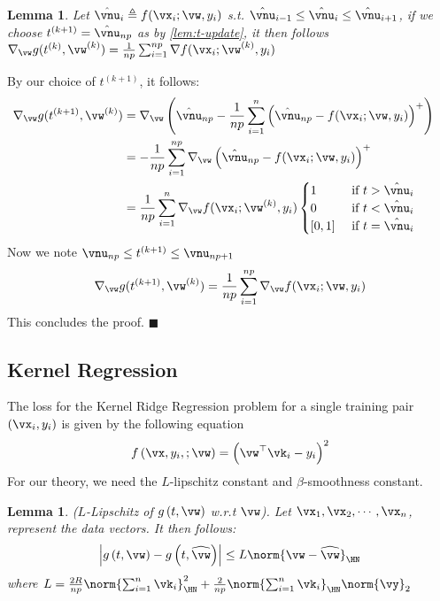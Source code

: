 \documentclass{article} %
\theoremstyle{plain}
\newtheorem{lemma}[thm]{Lemma}
\theoremstyle{definition}
\theoremstyle{remark}
\newcommand{\ccref}[1]{\textcolor{black}{\cref{#1}}}
\begin{document}
	\begin{lemma}
		Let $\hat{\vnu}_i \triangleq f(\vx_i;\vw,y_i)$ s.t. $\hat{\vnu}_{i-1} \leq \hat{\vnu}_{i} \leq \hat{\vnu}_{i+1}$, if we choose $t^{(k+1)} = \hat{\vnu}_{np}$ as by \ccref{lem:t-update}, it then follows $ \nabla_\vw g(t^{(k)},\vw^{(k)}) = \frac{1}{np}\sum_{i=1}^{np} \nabla f(\vx_i;\vw^{(k)},y_i)$
	\end{lemma}
		By our choice of $t^{(k+1)}$, it follows:
		\begin{align}
			\nabla_\vw g(t^{(k+1)},\vw^{(k)}) &= \nabla_\vw\left(\hat{\vnu}_{np} - \frac{1}{np}\sum_{i=1}^{n}\left(\hat{\vnu}_{np} - f(\vx_i;\vw,y_i)\right)^+\right) &&\\
			&= -\frac{1}{np}\sum_{i=1}^{np}\nabla_\vw\left(\hat{\vnu}_{np} - f(\vx_i;\vw,y_i)\right)^+ &&\\
			&= \frac{1}{np}\sum_{i=1}^n\nabla_\vw f(\vx_i;\vw^{(k)},y_i)\begin{cases}
				1 & \text{ if } t > \hat{\vnu}_i \\
				0 & \text{ if } t < \hat{\vnu}_i \\
				[0,1] & \text{ if } t = \hat{\vnu}_i 
			\end{cases} &&
		\end{align}
		Now we note $\vnu_{np} \leq t^{(k+1)} \leq \vnu_{np+1}$
		\begin{equation}
			\nabla_\vw g(t^{(k+1)},\vw^{(k)}) = \frac{1}{np}\sum_{i=1}^{np} \nabla_\vw f(\vx_i;\vw,y_i)
		\end{equation}
		This concludes the proof.
	\hfill $\blacksquare$
	
	\subsection{Kernel Regression} \label{sec:kernel-regression}
	The loss for the Kernel Ridge Regression problem for a single training pair $(\vx_i,y_i)$ is given by the following equation
	\begin{equation}
		f\left(\vx,y_i,;\vw\right) = \left( \vw^{\top}\vk_i - y_i\right)^2 
	\end{equation}
	For our theory, we need the $L$-lipschitz constant and $\beta$-smoothness constant. 
	
	\begin{lemma} \label{lem:kernel-regression-lipschitz}
		($L$-Lipschitz of $g\left(t,\vw\right)$ w.r.t $\vw$). Let $\vx_1,\vx_2,\cdots,\vx_n$, represent the data vectors. It then follows:
		\begin{equation}
			\left| g\left(t,\vw\right) - g\left(t,\widehat{\vw}\right)\right| \leq L\norm{\vw - \widehat{\vw}}_{\HN}
		\end{equation}
		where $ L = \frac{2R}{np}\norm{\sum_{i=1}^n\vk_i}_{\HN}^2 + \frac{2}{np}\norm{\sum_{i=1}^n \vk_{i}}_{\HN}\norm{\vy}_2$
	\end{lemma}
	
\end{document}

